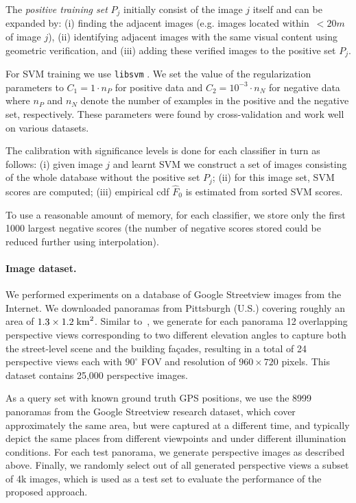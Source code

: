       The \emph{positive training set} $P_j$ initially consist of the image $j$ itself and can be expanded by:  (i) finding the adjacent images (e.g. images located within~$<20m$ of image $j$), (ii) identifying adjacent images with the same visual content using geometric verification, and (iii) adding these verified images to the positive set $P_j$.

      For SVM training we use {\tt libsvm} \cite{libsvm}. We set the value of the regularization parameters to $C_1=1 \cdot n_P$ for positive data and $C_2=10^{-3} \cdot n_N$ for negative data where $n_P$ and $n_N$ denote the number of examples in the positive and the negative set, respectively. These parameters were found by cross-validation and work well on various datasets. 

      The calibration with significance levels is done for each classifier in turn as follows: (i) given image $j$ and learnt SVM we construct a set of images consisting of the whole database without the positive set $P_j$; (ii) for this image set, SVM scores are computed; (iii) empirical cdf $\hat{F}_0$ is estimated from sorted SVM scores.

      To use a reasonable amount of memory, for each classifier, we store only the first 1000 largest negative scores (the number of negative scores stored could be reduced further using interpolation).
   \paragraph{Image dataset.}
      We performed experiments on a database of Google Streetview images from the Internet. We downloaded panoramas from Pittsburgh (U.S.) covering roughly an area of $1.3 \times 1.2 \; {\rm km}^2$. Similar to~\cite{Chen11}, we generate for each panorama 12 overlapping perspective views corresponding to two different elevation angles to capture both the street-level scene and the building fa\c{c}ades, resulting in a total of 24 perspective views each with $90^\circ$ FOV and resolution of $960 \times 720$ pixels. This dataset contains 25,000 perspective images.

      As a query set with known ground truth GPS positions, we use the 8999 panoramas from the Google Streetview research dataset, which cover approximately the same area, but were captured at a different time, and typically depict the same places from different viewpoints and under different illumination conditions. For each test panorama, we generate perspective images as described above. Finally, we randomly select out of all generated perspective views a subset of 4k images, which is used as a test set to evaluate the performance of the proposed approach.

